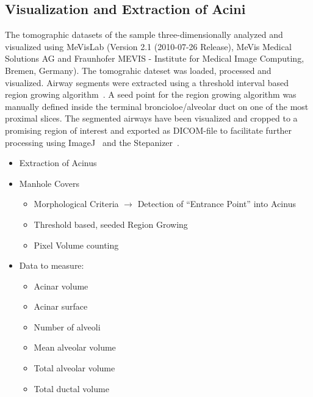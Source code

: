 \documentclass[%
	paper=a4,%
	DIV=calc,%
	twoside=true,%
	draft=true,%
	abstract=false]{scrartcl}
\begin{document}
\subsection{Visualization and Extraction of Acini}
The tomographic datasets of the sample three-dimensionally analyzed and visualized using MeVisLab (Version 2.1 (2010-07-26 Release), MeVis Medical Solutions AG and Fraunhofer MEVIS - Institute for Medical Image Computing, Bremen, Germany). The tomograhic dateset was loaded, processed and visualized. Airway segments were extracted using a threshold interval based region growing algorithm~\cite{Zucker1976}. A seed point for the region growing algorithm was manually defined inside the terminal broncioloe/alveolar duct on one of the most proximal slices. The segmented airways have been visualized and cropped to a promising region of interest and exported as DICOM-file to facilitate further processing using ImageJ~\cite{Abramoff2004} and the Stepanizer~\cite{Tschanz2010}.

\begin{itemize}
	\item Extraction of Acinus
	\item Manhole Covers
	\begin{itemize}
		\item Morphological Criteria $\rightarrow$ Detection of ``Entrance Point'' into Acinus
		\item Threshold based, seeded Region Growing
		\item Pixel Volume counting
	\end{itemize}
	\item Data to measure:
	\begin{itemize}
		\item Acinar volume
		\item Acinar surface
		\item Number of alveoli
		\item Mean alveolar volume
		\item Total alveolar volume
		\item Total ductal volume
	\end{itemize}
\end{itemize}
\end{document}
